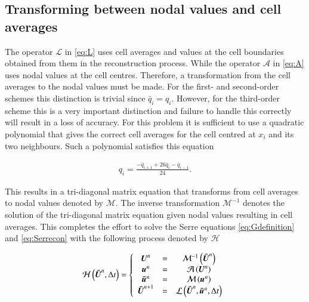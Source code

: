 \documentclass[SingleSpace,12pt]{Serre_ASCE}
\begin{document}
\subsection{Transforming between nodal values and cell averages} %
The operator $\mathcal{L}$ in \eqref{eq:L} uses cell averages and values at the cell boundaries obtained from them in the reconstruction process. While the operator $\mathcal{A}$ in \eqref{eq:A} uses nodal values at the cell centres. Therefore, a transformation from the cell averages to the nodal values must be made. For the first- and second-order schemes this distinction is trivial since $\bar{q}_i = q_i$. However, for the third-order scheme this is a very important distinction and failure to handle this correctly will result in a loss of accuracy. For this problem it is sufficient to use a quadratic polynomial that gives the correct cell averages for the cell centred at $x_i$ and its two neighbours. Such a polynomial satisfies this equation
\begin{linenomath*}
\begin{gather}\label{eq:midtoca}
q_i = \frac{- \bar{q}_{i+1} + 26\bar{q}_{i} - \bar{q}_{i-1}}{24}.
\end{gather}
\end{linenomath*}
This results in a tri-diagonal matrix equation that transforms from cell averages to nodal values denoted by $\mathcal{M}$. The inverse transformation $\mathcal{M}^{-1}$ denotes the solution of the tri-diagonal matrix equation given nodal values resulting in cell averages. This completes the effort to solve the Serre equations \eqref{eq:Gdefinition} and \eqref{eq:Serrecon} with the following process denoted by $\mathcal{H}$
\begin{linenomath*}
\begin{gather}
\mathcal{H}\left(\boldsymbol{\bar{U}}^n,\Delta t \right) = \left\lbrace 
\begin{array}{c c c} 
	\boldsymbol{U}^n &=& \mathcal{M}^{-1}\left(\boldsymbol{\bar{U}}^n\right) \\
	\boldsymbol{u}^n &=& \mathcal{A}\left(\boldsymbol{U}^n\right) \\
	\boldsymbol{\bar{u}}^n &=&  \mathcal{M}\left(\boldsymbol{u}^n\right) \\
	\boldsymbol{\bar{U}}^{n+1} &=& \mathcal{L}\left(\boldsymbol{\bar{U}}^{n},\boldsymbol{\bar{u}}^n,\Delta t\right)							
\end{array} \right.
\end{gather}
\end{linenomath*}
\end{document}
